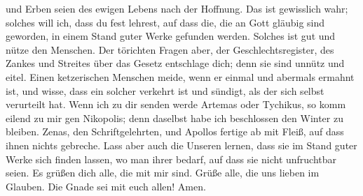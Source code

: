 und Erben seien des ewigen Lebens nach der Hoffnung.  Das
ist gewisslich wahr; solches will ich, dass du fest lehrest, auf dass
die, die an Gott gläubig sind geworden, in einem Stand guter Werke
gefunden werden. Solches ist gut und nütze den Menschen. 
Der törichten Fragen aber, der Geschlechtsregister, des Zankes und
Streites über das Gesetz entschlage dich; denn sie sind unnütz und
eitel.  Einen ketzerischen Menschen meide, wenn er einmal
und abermals ermahnt ist,  und wisse, dass ein solcher
verkehrt ist und sündigt, als der sich selbst verurteilt hat.
 Wenn ich zu dir senden werde Artemas oder Tychikus, so
komm eilend zu mir gen Nikopolis; denn daselbst habe ich beschlossen den
Winter zu bleiben.  Zenas, den Schriftgelehrten, und
Apollos fertige ab mit Fleiß, auf dass ihnen nichts gebreche.
 Lass aber auch die Unseren lernen, dass sie im Stand guter
Werke sich finden lassen, wo man ihrer bedarf, auf dass sie nicht
unfruchtbar seien.  Es grüßen dich alle, die mit mir sind.
Grüße alle, die uns lieben im Glauben. Die Gnade sei mit euch allen!
Amen.
